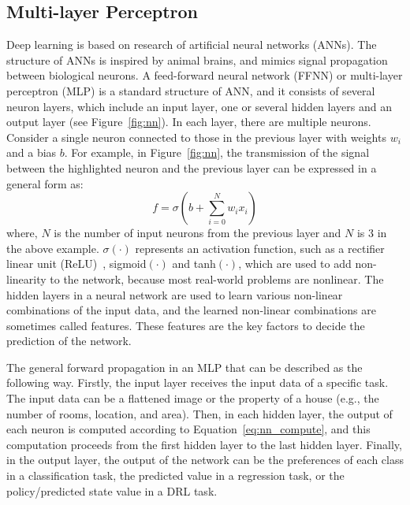 \subsection{Multi-layer Perceptron}
Deep learning is based on research of artificial neural networks (ANNs). The structure of ANNs is inspired by animal brains, and mimics signal propagation between biological neurons. A feed-forward neural network (FFNN) or multi-layer perceptron (MLP) is a standard structure of ANN, and it consists of several neuron layers, which include an input layer, one or several hidden layers and an output layer (see Figure~\ref{fig:nn}). In each layer, there are multiple neurons. Consider a single neuron connected to those in the previous layer with weights $w_{i}$ and a bias $b$. For example, in Figure~\ref{fig:nn}, the transmission of the signal between the highlighted neuron and the previous layer can be expressed in a general form as:
\begin{equation}
    f = \sigma (b + \sum_{i=0}^{N} w_{i}x_{i})
\label{eq:nn_compute}
\end{equation}
where, $N$ is the number of input neurons from the previous layer and $N$ is 3 in the above example. $\sigma(\cdot)$ represents an activation function, such as a rectifier linear unit (ReLU)~\cite{nair2010rectified}, sigmoid$(\cdot)$ and tanh$(\cdot)$, which are used to add non-linearity to the network, because most real-world problems are nonlinear. The hidden layers in a neural network are used to learn various non-linear combinations of the input data, and the learned non-linear combinations are sometimes called features. These features are the key factors to decide the prediction of the network.

The general forward propagation in an MLP that can be described as the following way. Firstly, the input layer receives the input data of a specific task. The input data can be a flattened image or the property of a house (e.g., the number of rooms, location, and area). Then, in each hidden layer, the output of each neuron is computed according to Equation~\eqref{eq:nn_compute}, and this computation proceeds from the first hidden layer to the last hidden layer. Finally, in the output layer, the output of the network can be the preferences of each class in a classification task, the predicted value in a regression task, or the policy/predicted state value in a DRL task.

